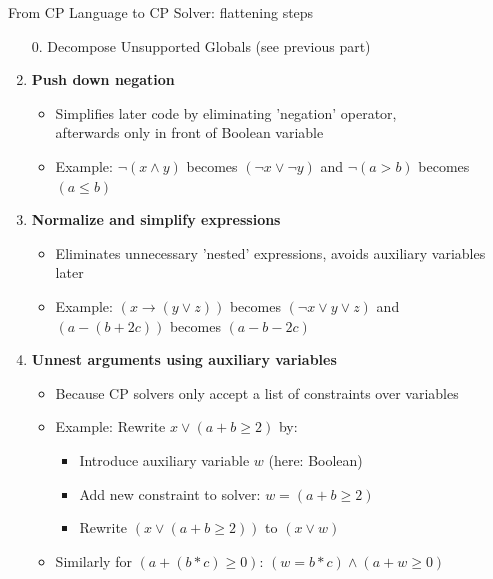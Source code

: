 \documentclass{cons-beamer}
\begin{document}
\begin{frame}{From CP Language to CP Solver: flattening steps}
  \begin{enumerate}
    \item[0.] Decompose Unsupported Globals (see previous part)

    \item \textbf{Push down negation}
      \begin{itemize}
        \item Simplifies later code by eliminating 'negation' operator, \\afterwards only in front of Boolean variable
        \item Example: $\neg(x \land y)$ becomes $(\neg x \lor \neg y)$ and $\neg (a > b)$ becomes $(a \leq b)$
      \end{itemize}

    \item \textbf{Normalize and simplify expressions}
      \begin{itemize}
        \item Eliminates unnecessary 'nested' expressions, avoids auxiliary variables later
        \item Example: $(x \rightarrow (y \lor z))$ becomes $(\neg x \lor y \lor z)$ and $(a - (b + 2c))$ becomes $(a -b -2c)$
      \end{itemize}

    \item \textbf{Unnest arguments using auxiliary variables}
      \begin{itemize}
        \item Because CP solvers only accept a list of constraints over variables
        \item Example: Rewrite $x \lor (a + b \geq 2)$ by:
          \begin{itemize}
            \item Introduce auxiliary variable $w$ (here: Boolean)
            \item Add new constraint to solver: \( w = (a + b \geq 2) \)
            \item Rewrite $(x \lor (a + b \geq 2))$ to $(x \lor w)$
          \end{itemize}
        \item Similarly for $(a + (b*c) \geq 0)$: $(w = b*c) \land (a + w \geq 0)$
      \end{itemize}
  \end{enumerate}
\end{frame}
\end{document}
